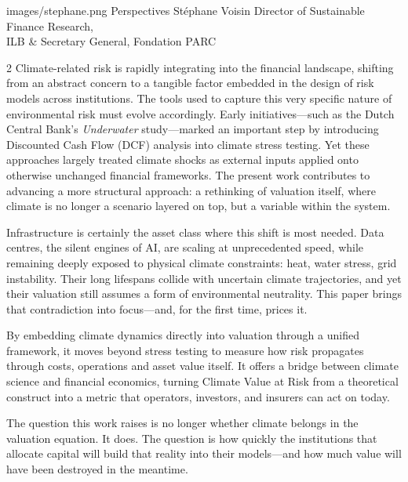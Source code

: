 \forewordpageright
  {images/stephane.png}
  {Perspectives}
  {St\'{e}phane Voisin}
  {Director of Sustainable Finance Research,\\ILB \& Secretary General, Fondation PARC}

\vspace{-3mm}
\vspace{6mm}

\begin{multicols}{2}\raggedcolumns
\color{SEDarkGreen}
\noindent Climate-related risk is rapidly integrating into the financial landscape, shifting from an abstract concern to a tangible factor embedded in the design of risk models across institutions. The tools used to capture this very specific nature of environmental risk must evolve accordingly. Early initiatives---such as the Dutch Central Bank's \textit{Underwater} study---marked an important step by introducing Discounted Cash Flow (DCF) analysis into climate stress testing. Yet these approaches largely treated climate shocks as external inputs applied onto otherwise unchanged financial frameworks. The present work contributes to advancing a more structural approach: a rethinking of valuation itself, where climate is no longer a scenario layered on top, but a variable within the system.

\vspace{4mm}

\noindent Infrastructure is certainly the asset class where this shift is most needed. Data centres, the silent engines of AI, are scaling at unprecedented speed, while remaining deeply exposed to physical climate constraints: heat, water stress, grid instability. Their long lifespans collide with uncertain climate trajectories, and yet their valuation still assumes a form of environmental neutrality. This paper brings that contradiction into focus---and, for the first time, prices it.

\columnbreak

\noindent By embedding climate dynamics directly into valuation through a unified framework, it moves beyond stress testing to measure how risk propagates through costs, operations and asset value itself. It offers a bridge between climate science and financial economics, turning Climate Value at Risk from a theoretical construct into a metric that operators, investors, and insurers can act on today.

\vspace{4mm}

\noindent The question this work raises is no longer whether climate belongs in the valuation equation. It does. The question is how quickly the institutions that allocate capital will build that reality into their models---and how much value will have been destroyed in the meantime.

\end{multicols}
